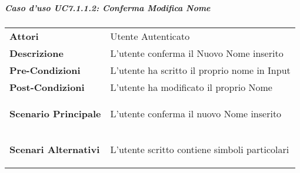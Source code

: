 \subparagraph{Caso d'uso UC7.1.1.2:  Conferma Modifica Nome}
\label{UC7_1_1_2}

\begin{tabular}{ l | p{11cm}}
	\hline
	\rowcolor{Gray}
	 \multicolumn{2}{c}{UC7.1.1.2 - Conferma Modifica Nome} \\
	 \hline
	\textbf{Attori} & Utente Autenticato \\
	\textbf{Descrizione} & L'utente conferma il Nuovo Nome inserito\\
	\textbf{Pre-Condizioni} & L'utente ha scritto il proprio nome in Input\\
	\textbf{Post-Condizioni} & L'utente ha modificato il proprio Nome\\
	\textbf{Scenario Principale} & 
	\begin{enumerate*}[label=(\arabic*.),itemjoin={\newline}]
		\item L'utente conferma il nuovo Nome inserito
	\end{enumerate*}\\
	\textbf{Scenari Alternativi} & 
	\begin{enumerate*}[label=(\arabic*.),itemjoin={\newline}]
		\item L'utente scritto contiene simboli particolari
	\end{enumerate*}\\
\end{tabular}